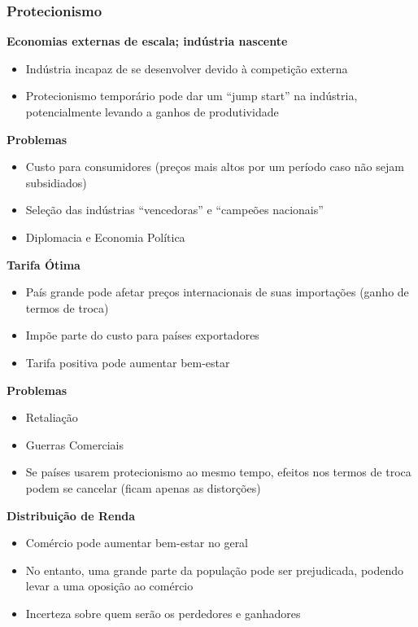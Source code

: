 \documentclass[a4paper,12pt]{article}[abntex2]
\begin{document}
\subsubsection{\textbf{Protecionismo}}
\textbf{Economias externas de escala; indústria nascente}
\begin{itemize}
  \item Indústria incapaz de se desenvolver devido à competição externa
  \item Protecionismo temporário pode dar um ``jump start'' na indústria, potencialmente levando a ganhos de produtividade
\end{itemize}

\textbf{Problemas}
\begin{itemize}
  \item Custo para consumidores (preços mais altos por um período caso não sejam subsidiados)
  \item Seleção das indústrias ``vencedoras'' e ``campeões nacionais''
  \item Diplomacia e Economia Política
\end{itemize}

\textbf{Tarifa Ótima}
\begin{itemize}
  \item País grande pode afetar preços internacionais de suas importações (ganho de termos de troca)
  \item Impõe parte do custo para países exportadores
  \item Tarifa positiva pode aumentar bem-estar
\end{itemize}

\textbf{Problemas}
\begin{itemize}
  \item Retaliação
  \item Guerras Comerciais
  \item Se países usarem protecionismo ao mesmo tempo, efeitos nos termos de troca podem se cancelar (ficam apenas as distorções)
\end{itemize}

\textbf{Distribuição de Renda}
\begin{itemize}
  \item Comércio pode aumentar bem-estar no geral
  \item No entanto, uma grande parte da população pode ser prejudicada, podendo levar a uma oposição ao comércio
  \item Incerteza sobre quem serão os perdedores e ganhadores
\end{itemize}
\end{document}
